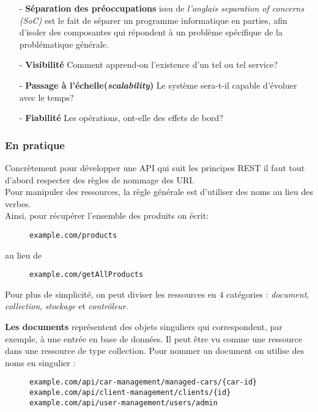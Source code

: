 \begin{itemize}
	\item [- \textbf{Séparation des préoccupations}] issu de \emph{l’anglais separation of concerns (SoC)} est le fait de séparer un programme informatique en parties, afin d'isoler des composantes qui répondent à un problème spécifique de la problématique générale.  
	\item [- \textbf{Visibilité}] Comment apprend-on l'existence d'un tel ou tel service? 
	\item [- \textbf{Passage à l'échelle(\emph{scalability})}] Le système sera-t-il capable d'évoluer avec le temps?
	\item [- \textbf{Fiabilité}] Les opérations, ont-elle des effets de bord?
\end{itemize}


\subsubsection{En pratique}
Concrètement pour développer une API qui suit les principes REST il faut tout d'abord respecter des règles de nommage des URI. \\
Pour manipuler des ressources, la règle générale est d'utiliser des noms au lieu des verbes.\\
Ainsi, pour récupérer l'ensemble des produits on écrit:
\begin{figure}[h!]
	\begin{lstlisting}[frame=leftline]
example.com/products
	\end{lstlisting}
\end{figure}

au lieu de 


\begin{figure}[h!]
	\begin{lstlisting}[frame=leftline]
example.com/getAllProducts
	\end{lstlisting}
\end{figure}
 
Pour plus de simplicité, on peut diviser les ressources en 4 catégories : \emph{document}, \emph{collection}, \emph{stockage} et \emph{contrôleur}. 

\textbf{Les documents} représentent des objets singuliers qui  correspondent, par exemple, à une entrée en base de données. Il peut être vu comme une ressource dans une ressource de type collection. Pour nommer un document on utilise des noms en singulier : 
\begin{figure}[h!]
	\begin{lstlisting}[frame=leftline]
example.com/api/car-management/managed-cars/{car-id}
example.com/api/client-management/clients/{id}
example.com/api/user-management/users/admin
	\end{lstlisting}
\end{figure}

